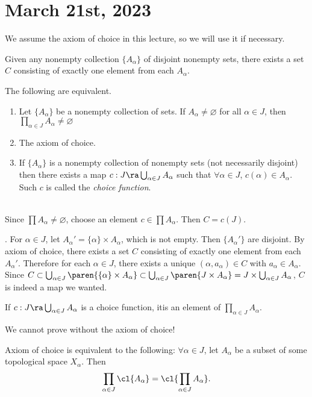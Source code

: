 \section*{March 21st, 2023}

We assume the axiom of choice in this lecture, so we will use it if necessary.

\rmk {} Given any nonempty collection \(\{A_\alpha\}\) of disjoint nonempty sets, there exists a set \(C\) consisting of exactly one element from each \(A_\alpha\).

\rmk The following are equivalent.
\begin{enumerate}
    \item Let \(\{A_\alpha\}\) be a nonempty collection of sets. If \(A_\alpha \neq \varnothing\) for all \(\alpha \in J\), then \(\prod_{\alpha \in J} A_\alpha \neq \varnothing\)
    \item The axiom of choice.
    \item If \(\{A_\alpha\}\) is a nonempty collection of nonempty sets (not necessarily disjoint) then there exists a map \(c : J \ra \bigcup_{\alpha \in J} A_\alpha\) such that \(\forall \alpha \in J\), \(c(\alpha) \in A_\alpha\). Such \(c\) is called the \textit{choice function}.
\end{enumerate}

\pf \\
 Since \(\prod A_\alpha \neq \varnothing\), choose an element \(c \in \prod A_\alpha\). Then \(C = c(J)\).

 . For \(\alpha \in J\), let \(A_\alpha' = \{\alpha\} \times A_\alpha\), which is not empty. Then \(\{A_\alpha'\}\) are disjoint. By axiom of choice, there exists a set \(C\) consisting of exactly one element from each \(A_\alpha'\). Therefore for each \(\alpha \in J\), there exists a unique \((\alpha, a_\alpha) \in C\) with \(a_\alpha \in A_\alpha\). Since \(C \subset \bigcup_{\alpha \in J} \paren{\{\alpha\} \times A_\alpha} \subset \bigcup_{\alpha \in J} \paren{J \times A_\alpha} = J \times \bigcup_{\alpha \in J} A_\alpha\), \(C\) is indeed a map we wanted.

 If \(c : J \ra \bigcup_{\alpha \in J} A_\alpha\) is a choice function, itis an element of \(\prod_{\alpha \in J} A_\alpha\).

We cannot prove  without the axiom of choice!

\rmk Axiom of choice is equivalent to the following: \(\forall \alpha \in J\), let \(A_\alpha\) be a subset of some topological space \(X_\alpha\). Then
\[
    \prod_{\alpha \in J} \cl{A_\alpha} = \cl{\prod_{\alpha \in J} A_\alpha}.
\]

